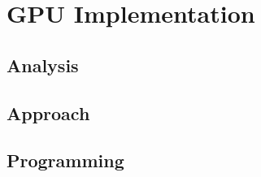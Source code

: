 \section{GPU Implementation}
\label{sec:implementation}

\subsection{Analysis}

\subsection{Approach}

\subsection{Programming}